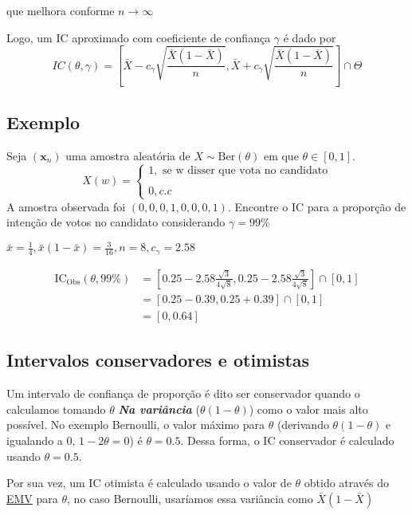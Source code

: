 \documentclass[
  letterpaper,
  DIV=11,
  numbers=noendperiod]{scrreprt}
\begin{document}
que melhora conforme \(n \rightarrow \infty\)

Logo, um IC aproximado com coeficiente de confiança \(\gamma\) é dado
por \[
IC(\theta, \gamma) = \left[\bar{X} - c_{\gamma} \sqrt{ \frac{\bar{X} (1-\bar{X})}{n} }, \bar{X} + c_{\gamma}
\sqrt{ \frac{\bar{X} (1-\bar{X})}{n} }\right] \cap \Theta
\]

\subsection{Exemplo}\label{exemplo-6}

Seja \((\pmb x_{n })\) uma amostra aleatória de
\(X\sim \mathrm{Ber} (\theta)\) em que \(\theta \in [0,1]\). \[
X(w) = \begin{cases}
1, \text{ se w disser que vota no candidato} \\ \\
0, c.c
\end{cases}
\] A amostra observada foi \((0,0,0,1,0,0,0,1)\). Encontre o IC para a
proporção de intenção de votos no candidato considerando
\(\gamma = 99\%\)

\(\bar{x} = \frac{1}{4 }, \bar{x}(1-\bar{x}) = \frac{3}{16}, n = 8, c_{\gamma} = 2.58\)

\[
\begin{aligned}
\mathrm{IC}_{\mathrm{Obs}}(\theta, 99\%) &= \left[0.25- 2.58 \frac{\sqrt{3}}{4\sqrt{8}}, 0.25 - 2.58 
\frac{\sqrt{3}}{4 \sqrt{8}}\right] \cap [0,1] \\
&= [0.25 - 0.39, 0.25 + 0.39] \cap [0,1]  \\
&= [0,0.64]
\end{aligned}
\]

\subsection{Intervalos conservadores e
otimistas}\label{intervalos-conservadores-e-otimistas}

Um intervalo de confiança de proporção é dito ser conservador quando o
calculamos tomando \(\theta\) \textbf{\emph{Na variância}}
(\(\theta(1-\theta)\)) como o valor mais alto possível. No exemplo
Bernoulli, o valor máximo para \(\theta\) (derivando
\(\theta(1-\theta)\) e igualando a 0, \(1-2 \theta = 0\)) é
\(\theta=0.5\). Dessa forma, o IC conservador é calculado usando
\(\theta=0.5\).

Por sua vez, um IC otimista é calculado usando o valor de \(\theta\)
obtido através do \href{emv.qmd}{EMV} para \(\theta\), no caso
Bernoulli, usaríamos essa variância como \(\bar{X}(1-\bar{X})\)
\end{document}
